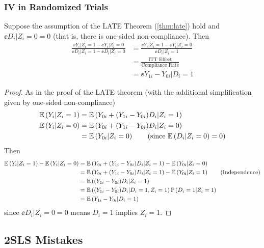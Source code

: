 \documentclass[11pt]{article}
\begin{document}
\subsubsection{IV in Randomized Trials}

\begin{theorem}
	Suppose the assumption of the LATE Theorem (\ref{thm:late}) hold and $\ee{D_i | Z_i = 0} = 0$ (that is, there is one-sided non-compliance). Then
	\begin{align*}
		\frac{\ee{Y_i | Z_i = 1} - \ee{Y_i | Z_i = 0}}{\ee{D_i | Z_i = 1} - \ee{D_i | Z_i = 0}} 
		&= \frac{\ee{Y_i | Z_i = 1} - \ee{Y_i | Z_i = 0}}{\ee{D_i | Z_i = 1}} \\
		&= \frac{\text{ITT Effect}}{\text{Compliance Rate}}\\
		&= \ee{Y_{1i} - Y_{0i} | D_i = 1}
	\end{align*}
\end{theorem}

\begin{proof}
	As in the proof of the LATE theorem (with the additional simplification given by one-sided non-compliance)
	\begin{align*}
		\ee{Y_i | Z_i = 1} &= \ee{Y_{0i} + (Y_{1i} - Y_{0i})D_i | Z_i = 1} \\
		\ee{Y_i | Z_i = 0} &= \ee{Y_{0i} + (Y_{1i} - Y_{0i})D_i | Z_i = 0} \\
		&= \ee{Y_{0i} | Z_i = 0} \tag{since $\ee{D_i | Z_i = 0} = 0$}
	\end{align*}
	Then
	\begin{align*}
		\mathop{{}\mathbb{E}}\left( Y_i | Z_i = 1 \right) - \mathop{{}\mathbb{E}}\left( Y_i | Z_i = 0 \right) &= \mathop{{}\mathbb{E}}\left( Y_{0i} + (Y_{1i} - Y_{0i})D_i | Z_i = 1 \right) - \mathop{{}\mathbb{E}}\left( Y_{0i} | Z_i = 0 \right) \\
		&= \mathop{{}\mathbb{E}}\left( Y_{0i} + (Y_{1i} - Y_{0i})D_i | Z_i = 1 \right) - \mathop{{}\mathbb{E}}\left( Y_{0i} | Z_i = 1 \right) \tag{Independence} \\
		&= \mathop{{}\mathbb{E}}\left( (Y_{1i} - Y_{0i})D_i | Z_i = 1 \right) \\
		&= \mathop{{}\mathbb{E}}\left( (Y_{1i} - Y_{0i})D_i | D_i = 1, Z_i = 1 \right) \mathop{{}\mathbb{P}}\left( D_i = 1 | Z_i = 1 \right) \\
		&= \mathop{{}\mathbb{E}}\left( Y_{1i} - Y_{0i} | D_i = 1 \right)
	\end{align*}
	since $\ee{D_i | Z_i = 0} = 0$ means $D_i = 1$ implies $Z_i = 1$.  
	
\end{proof}

\subsection{2SLS Mistakes}
\end{document}
